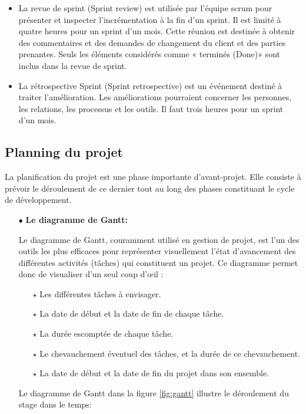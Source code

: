 \begin{itemize}[label=$\square$,leftmargin=* ,parsep=0cm,itemsep=0cm,topsep=0cm]
	\item \textsf{La revue de sprint (Sprint review)} est utilisée par l’équipe scrum pour présenter et inspecter l’incrémentation à la fin d’un sprint. Il est limité à quatre heures pour un sprint d’un mois. Cette réunion est destinée à obtenir des commentaires et des demandes de changement du client et des parties prenantes. Seuls les éléments considérés comme « terminés (Done)» sont inclus dans la revue de sprint. 
	\item \textsf{La rétrospective Sprint (Sprint retrospective)} est un événement destiné à traiter l’amélioration. Les améliorations pourraient concerner les personnes, les relations, les processus et les outils. Il faut trois heures pour un sprint d’un mois. 
\end{itemize}

\subsection{Planning du projet}

La planification du projet est une phase importante d’avant-projet. Elle consiste à prévoir le déroulement de ce dernier tout au long des phases constituant le cycle de développement.

\medskip
\begin{itemize}
\item[$\bullet$] \textbf{Le diagramme de Gantt:}

Le diagramme de Gantt, couramment utilisé en gestion de projet, est l'un des outils les plus
efficaces pour représenter visuellement l'état d'avancement des différentes activités (tâches) qui constituent un projet.
Ce diagramme permet donc de visualiser d'un seul coup d'œil :
  \begin{itemize}
	\item[$\star$]Les différentes tâches à envisager. 
	\item[$\star$]La date de début et la date de fin de chaque tâche.
	\item[$\star$] La durée escomptée de chaque tâche. 
	\item[$\star$] Le chevauchement éventuel des tâches, et la durée de ce chevauchement.
	\item[$\star$] La date de début et la date de fin du projet dans son ensemble.
\end{itemize}

Le diagramme de Gantt dans la figure \ref{fig:gantt} illustre le déroulement du stage dans le temps:
\end{itemize}

